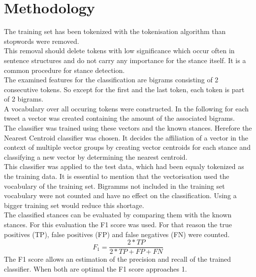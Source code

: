 \documentclass[a4paper,12pt,twoside]{article}
\begin{document}
\section{Methodology}
The training set has been tokenized with the tokenisation algorithm than stopwords were removed. \\
This removal should delete tokens with low significance which occur often in sentence structures and do not carry any importance for the stance itself. It is a common procedure for stance detection.\\
The examined features for the classification are bigrams consisting of 2 consecutive tokens. So except for the first and the last token, each token is part of 2 bigrams.\\
A vocabulary over all occuring tokens were constructed. In the following for each tweet a vector was created containing the amount of the associated bigrams.\\
The classifier was trained using these vectors and the known stances. Herefore the Nearest Centroid classifier was chosen. It decides the affiliation of a vector in the context of multiple vector groups by creating vector centroids for each stance and classifying a new vector by determining the nearest centroid.\\
This classifier was applied to the test data, which had been equaly tokenized as the training data. It is essential to mention that the vectorisation used the vocabulary of the training set. Bigramms not included in the training set vocabulary were not counted and have no effect on the classification. Using a bigger training set would reduce this shortage. \\
The classified stances can be evaluated by comparing them with the known stances. For this evaluation the F1 score was used. For that reason the true positives (TP), false positives (FP) and false negatives (FN) were counted.
\begin{equation}
F_1 = \frac{2*TP}{ 2*TP + FP + FN}
\end{equation}
The F1 score allows an estimation of the precision and recall of the trained classifier. When both are optimal the F1 score approaches 1.
\end{document}
